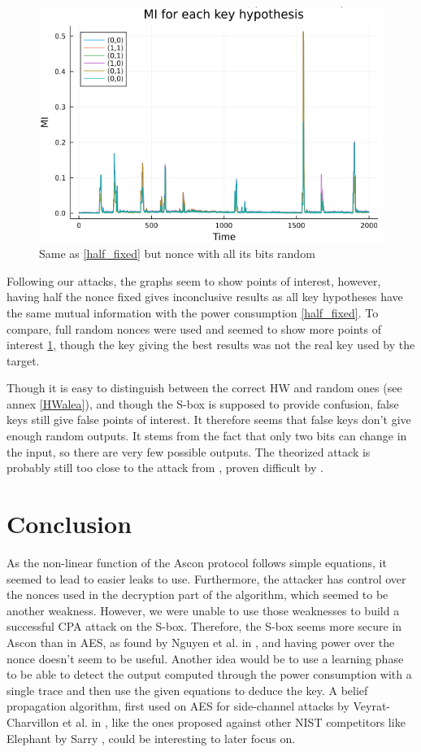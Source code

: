 \documentclass[11pt,technote]{IEEEtran}
\begin{document}
	\begin{figure}[h]
		\centering
		\includegraphics[scale=0.4]{img_files/nonces_alea}
		\caption{Same as \ref{half_fixed} but nonce with all its bits random}
		\label{all_alea}
	\end{figure}
	
	Following our attacks, the graphs seem to show points of interest, however, having half the nonce fixed gives inconclusive results as all key hypotheses have the same mutual information with the power consumption \ref{half_fixed}. To compare, full random nonces were used and seemed to show more points of interest \ref{all_alea}, though the key giving the best results was not the real key used by the target.
	
	Though it is easy to distinguish between the correct HW and random ones (see annex \ref{HWalea}), and though the S-box is supposed to provide confusion, false keys still give false points of interest. It therefore seems that false keys don't give enough random outputs. It stems from the fact that only two bits can change in the input, so there are very few possible outputs. The theorized attack is probably still too close to the attack from \cite{dl_cpa}, proven difficult by \cite{cpa_analysis}.
	
	\section{Conclusion}
	As the non-linear function of the Ascon protocol follows simple equations, it seemed to lead to easier leaks to use. Furthermore, the attacker has control over the nonces used in the decryption part of the algorithm, which seemed to be another weakness. However, we were unable to use those weaknesses to build a successful CPA attack on the S-box. Therefore, the S-box seems more secure in Ascon than in AES, as found by Nguyen et al. in \cite{cpa_analysis}, and having power over the nonce doesn't seem to be useful. Another idea would be to use a learning phase to be able to detect the output computed through the power consumption with a single trace and then use the given equations \cite{these} to deduce the key. A belief propagation algorithm, first used on AES for side-channel attacks by Veyrat-Charvillon et al. in \cite{bp_aes}, like the ones proposed against other NIST competitors like Elephant by Sarry \cite{these}, could be interesting to later focus on.
	
\end{document}
